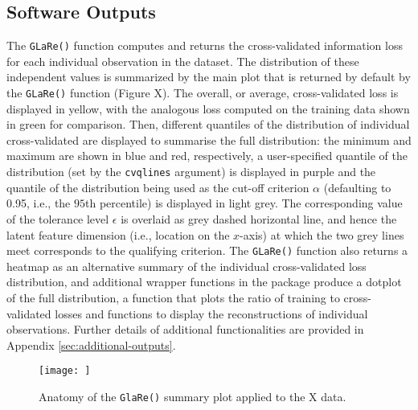 \subsection{Software Outputs}

The \texttt{GLaRe()} function computes and returns the cross-validated information loss for each individual observation in the dataset.
The distribution of these independent values is summarized by the main plot that is returned by default by the \texttt{GLaRe()} function (Figure {\color{red}X}).
The overall, or average, cross-validated loss is displayed in yellow, with the analogous loss computed on the training data shown in green for comparison.
Then, different quantiles of the distribution of individual cross-validated are displayed to summarise the full distribution: the minimum and maximum are shown in blue and red, respectively, a user-specified quantile of the distribution (set by the \texttt{cvqlines} argument) is displayed in purple and the quantile of the distribution being used as the cut-off criterion $\alpha$ (defaulting to 0.95, i.e., the $95$th percentile) is displayed in light grey.
The corresponding value of the tolerance level $\epsilon$ is overlaid as grey dashed horizontal line, and hence the latent feature dimension (i.e., location on the $x$-axis) at which the two grey lines meet corresponds to the qualifying criterion.
The \texttt{GLaRe()} function also returns a heatmap as an alternative summary of the individual cross-validated loss distribution, and additional wrapper functions in the package produce a dotplot of the full distribution, a function that plots the ratio of training to cross-validated losses and functions to display the reconstructions of individual observations. Further details of additional functionalities are provided in Appendix \ref{sec:additional-outputs}.

\begin{figure}
    \centering
    \texttt{[image: ]}
    \caption{Anatomy of the \texttt{GlaRe()} summary plot applied to the {\color{red}X} data.}
    \label{fig:enter-label}
\end{figure}